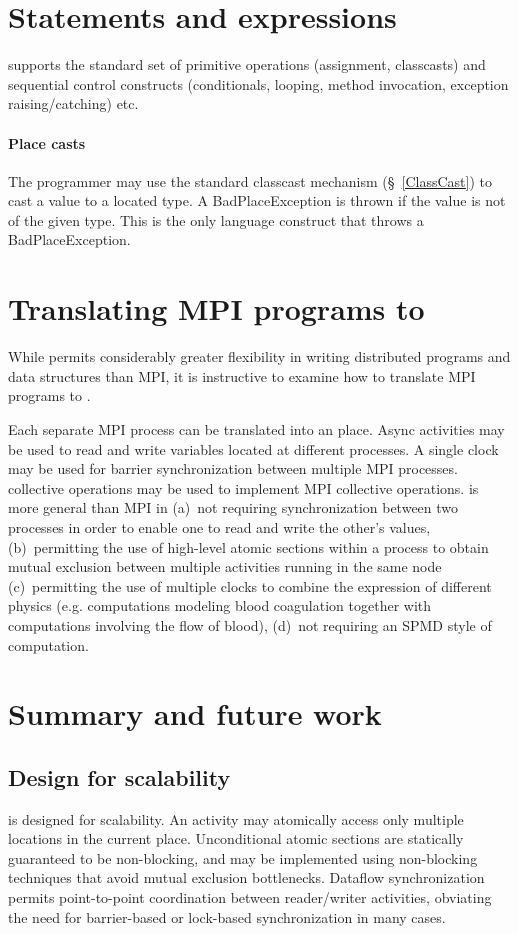 \section{Statements and expressions}
\Xten{} supports the standard set of primitive operations (assignment, classcasts) and sequential control constructs (conditionals, looping, method
invocation, exception raising/catching) etc.

\paragraph{Place casts}
The programmer may use the standard classcast mechanism
(\S~\ref{ClassCast}) to cast a value to a located type. A {\cf
BadPlaceException} is thrown if the value is not of the given
type. This is the only language construct that throws a {\cf
BadPlaceException}.

\section{Translating MPI programs to \Xten{}}

While \Xten{} permits considerably greater flexibility in writing
distributed programs and data structures than MPI, it is instructive
to examine how to translate MPI programs to \Xten.

Each separate MPI process can be translated into an \Xten{}
place. Async activities may be used to read and write variables
located at different processes. A single clock may be used for barrier
synchronization between multiple MPI processes. \Xten{} collective
operations may be used to implement MPI collective operations.
\Xten{} is more general than MPI in (a)~not requiring synchronization
between two processes in order to enable one to read and write the
other's values, (b)~permitting the use of high-level atomic sections
within a process to obtain mutual exclusion between multiple
activities running in the same node (c)~permitting the use of multiple
clocks to combine the expression of different physics (e.g.{}
computations modeling blood coagulation together with computations
involving the flow of blood), (d)~not requiring an SPMD style of
computation.


\section{Summary and future work}
\subsection{Design for scalability}
\Xten{} is designed for scalability. An activity may atomically
access only multiple locations in the current place. Unconditional
atomic sections are statically guaranteed to be non-blocking, and may
be implemented using non-blocking techniques that avoid mutual
exclusion bottlenecks. Dataflow synchronization permits point-to-point
coordination between reader/writer activities, obviating the need for
barrier-based or lock-based synchronization in many cases.


